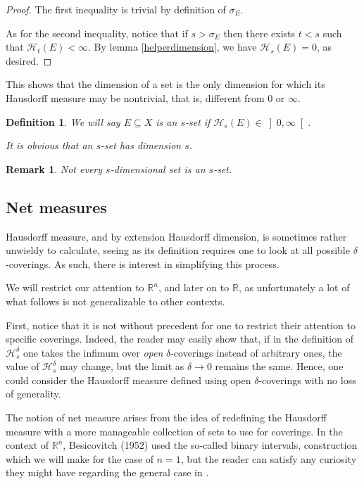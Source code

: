 \documentclass[11pt]{amsart}
\newcommand{\R}{\mathbb{R}}
\newcommand{\HH}{\mathcal{H}}
\newtheorem{definition}{Definition}
\newtheorem*{remark}{Remark}
\begin{document}
\begin{proof}
The first inequality is trivial by definition of $\sigma_E$.

As for the second inequality, notice that if $s > \sigma_E$ then there exists $t < s$ such that $\HH_t(E) < \infty$. By lemma \ref{helperdimension}, we have $\HH_s(E) = 0$, as desired.
\end{proof}

This shows that the dimension of a set is the only dimension for which its Hausdorff measure may be nontrivial, that is, different from $0$ or $\infty$.

\begin{definition}
We will say $E \subseteq X$ is an \emph{$s$-set} if $\HH_s(E) \in \left]0, \infty \right[$.

It is obvious that an $s$-set has dimension $s$.
\end{definition}

\begin{remark}
Not every $s$-dimensional set is an $s$-set.
\end{remark}

\subsection{Net measures}

Hausdorff measure, and by extension Hausdorff dimension, is sometimes rather unwieldy to calculate, seeing as its definition requires one to look at all possible $\delta$-coverings. As such, there is interest in simplifying this process.

We will restrict our attention to $\R^n$, and later on to $\R$, as unfortunately a lot of what follows is not generalizable to other contexts.

First, notice that it is not without precedent for one to restrict their attention to specific coverings. Indeed, the reader may easily show that, if in the definition of $\HH_s^\delta$ one takes the infimum over \emph{open} $\delta$-coverings instead of arbitrary ones, the value of $\HH_s^\delta$ may change, but the limit as $\delta \to 0$ remains the same. Hence, one could consider the Hausdorff measure defined using open $\delta$-coverings with no loss of generality.

The notion of net measure arises from the idea of redefining the Hausdorff measure with a more manageable collection of sets to use for coverings. In the context of $\R^n$, Besicovitch (1952) used the so-called binary intervals, construction which we will make for the case of $n = 1$, but the reader can satisfy any curiosity they might have regarding the general case in \cite{falconer} \cite{rogers}.
\end{document}
